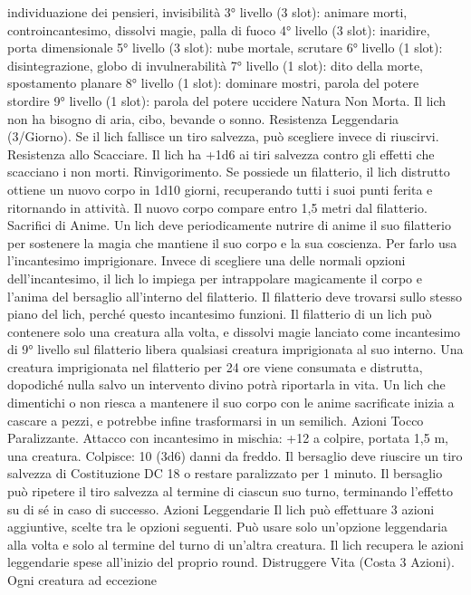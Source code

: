 \begin{multicols}{2}
individuazione dei pensieri, invisibilità
3° livello (3 slot): animare morti, controincantesimo, dissolvi
magie, palla di fuoco
4° livello (3 slot): inaridire, porta dimensionale
5° livello (3 slot): nube mortale, scrutare
6° livello (1 slot): disintegrazione, globo di invulnerabilità
7° livello (1 slot): dito della morte, spostamento planare
8° livello (1 slot): dominare mostri, parola del potere stordire
9° livello (1 slot): parola del potere uccidere
Natura Non Morta. Il lich non ha bisogno di aria, cibo, bevande
o sonno.
Resistenza Leggendaria (3/Giorno). Se il lich fallisce un tiro
salvezza, può scegliere invece di riuscirvi.
Resistenza allo Scacciare. Il lich ha +1d6 ai tiri salvezza
contro gli effetti che scacciano i non morti.
Rinvigorimento. Se possiede un filatterio, il lich distrutto ottiene
un nuovo corpo in 1d10 giorni, recuperando tutti i suoi punti
ferita e ritornando in attività. Il nuovo corpo compare entro 1,5
metri dal filatterio.
Sacrifici di Anime. Un lich deve periodicamente nutrire di anime
il suo filatterio per sostenere la magia che mantiene il suo corpo
e la sua coscienza. Per farlo usa l’incantesimo imprigionare.
Invece di scegliere una delle normali opzioni dell’incantesimo, il
lich lo impiega per intrappolare magicamente il corpo e l’anima
del bersaglio all’interno del filatterio. Il filatterio deve trovarsi
sullo stesso piano del lich, perché questo incantesimo funzioni. Il
filatterio di un lich può contenere solo una creatura alla volta, e
dissolvi magie lanciato come incantesimo di 9° livello sul
filatterio libera qualsiasi creatura imprigionata al suo interno.
Una creatura imprigionata nel filatterio per 24 ore viene
consumata e distrutta, dopodiché nulla salvo un intervento divino
potrà riportarla in vita.
Un lich che dimentichi o non riesca a mantenere il suo corpo con
le anime sacrificate inizia a cascare a pezzi, e potrebbe infine
trasformarsi in un semilich.
Azioni
Tocco Paralizzante. Attacco con incantesimo in mischia: +12 a
colpire, portata 1,5 m, una creatura.
Colpisce: 10 (3d6) danni da freddo. Il bersaglio deve riuscire un
tiro salvezza di Costituzione DC 18 o restare paralizzato per 1
minuto. Il bersaglio può ripetere il tiro salvezza al termine di
ciascun suo turno, terminando l’effetto su di sé in caso di
successo.
Azioni Leggendarie
Il lich può effettuare 3 azioni aggiuntive, scelte tra le opzioni
seguenti. Può usare solo un’opzione leggendaria alla volta e solo
al termine del turno di un’altra creatura. Il lich recupera le azioni
leggendarie spese all’inizio del proprio round.
Distruggere Vita (Costa 3 Azioni). Ogni creatura ad eccezione

\end{multicols}
